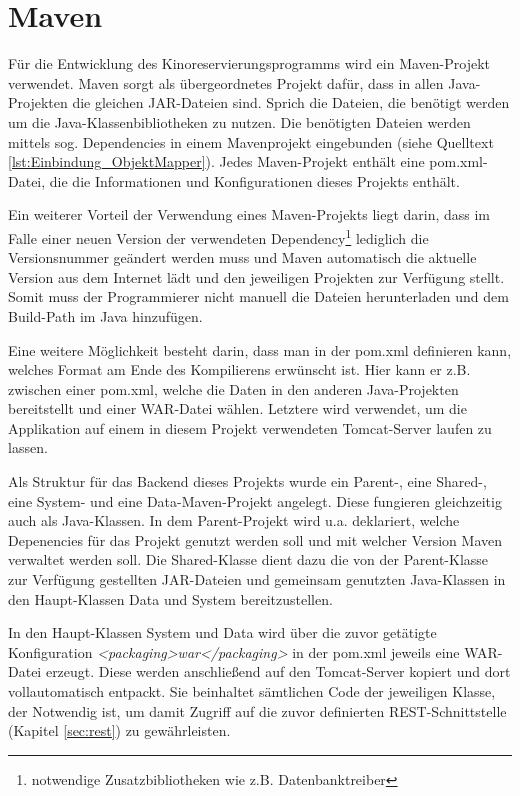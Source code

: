 \section{Maven}
\label{sec:maven}
Für die Entwicklung des Kinoreservierungsprogramms wird ein Maven-Projekt verwendet. Maven sorgt als übergeordnetes Projekt dafür, dass in allen Java-Projekten die gleichen JAR-Dateien sind. Sprich die Dateien, die benötigt werden um die Java-Klassenbibliotheken zu nutzen. Die benötigten Dateien werden mittels sog. Dependencies in einem Mavenprojekt eingebunden (siehe Quelltext \vref{lst:Einbindung_ObjektMapper}). Jedes Maven-Projekt enthält eine pom.xml-Datei, die die Informationen und Konfigurationen dieses Projekts enthält. 

Ein weiterer Vorteil der Verwendung eines Maven-Projekts liegt darin, dass im Falle einer neuen Version der verwendeten Dependency\footnote{notwendige Zusatzbibliotheken wie z.B. Datenbanktreiber} lediglich die Versionsnummer geändert werden muss und Maven automatisch die aktuelle Version aus dem Internet lädt und den jeweiligen Projekten zur Verfügung stellt. Somit muss der Programmierer nicht manuell die Dateien herunterladen und dem Build-Path im Java hinzufügen. 

Eine weitere Möglichkeit besteht darin, dass man in der pom.xml definieren kann, welches Format am Ende des Kompilierens erwünscht ist. Hier kann er z.B.  zwischen einer pom.xml, welche die Daten in den anderen Java-Projekten bereitstellt und einer WAR-Datei wählen. Letztere wird verwendet, um die Applikation auf einem in diesem Projekt verwendeten Tomcat-Server laufen zu lassen. 

Als Struktur für das Backend dieses Projekts wurde ein Parent-, eine Shared-, eine System- und eine Data-Maven-Projekt angelegt. Diese fungieren gleichzeitig auch als Java-Klassen. In dem Parent-Projekt wird u.a. deklariert, welche Depenencies für das Projekt genutzt werden soll und mit welcher Version Maven verwaltet werden soll. Die Shared-Klasse dient dazu die von der Parent-Klasse zur Verfügung gestellten JAR-Dateien und gemeinsam genutzten Java-Klassen in den Haupt-Klassen Data und System bereitzustellen.

In den Haupt-Klassen System und Data wird über die zuvor getätigte Konfiguration \emph{<packaging>war</packaging>} in der pom.xml jeweils eine WAR-Datei erzeugt. Diese werden anschließend auf den Tomcat-Server kopiert und dort vollautomatisch entpackt. Sie beinhaltet sämtlichen Code der jeweiligen Klasse, der Notwendig ist, um damit Zugriff auf die zuvor definierten REST-Schnittstelle (Kapitel \vref{sec:rest}) zu gewährleisten. 